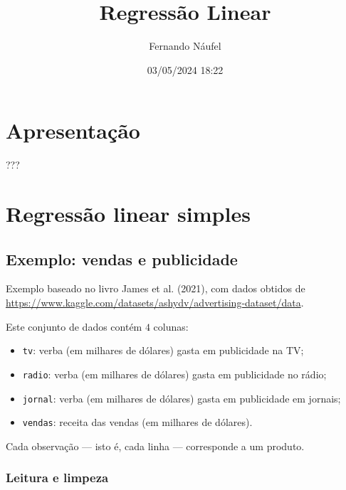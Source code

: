 \documentclass[
  letterpaper,
  DIV=11,
  numbers=noendperiod]{scrreprt}
\title{Regressão Linear}
\author{Fernando Náufel}
\date{03/05/2024 18:22}
\providecommand{\tightlist}{%
  \setlength{\itemsep}{0pt}\setlength{\parskip}{0pt}}\usepackage{longtable,booktabs,array}
\renewcommand*\contentsname{Índice}
\newcommand\contentsname{Índice}
\begin{document}
\maketitle


\renewcommand*\contentsname{Índice}
{
\hypersetup{linkcolor=}
\setcounter{tocdepth}{2}
\tableofcontents
}

\chapter*{Apresentação}\label{apresentauxe7uxe3o}


???


\chapter{Regressão linear simples}\label{regressuxe3o-linear-simples}

\section{Exemplo: vendas e
publicidade}\label{exemplo-vendas-e-publicidade}

Exemplo baseado no livro James et al. (2021), com dados obtidos de
\url{https://www.kaggle.com/datasets/ashydv/advertising-dataset/data}.

Este conjunto de dados contém $4$ colunas:

\begin{itemize}
\tightlist
\item
  \texttt{tv}: verba (em milhares de dólares) gasta em publicidade na
  TV;
\item
  \texttt{radio}: verba (em milhares de dólares) gasta em publicidade no
  rádio;
\item
  \texttt{jornal}: verba (em milhares de dólares) gasta em publicidade
  em jornais;
\item
  \texttt{vendas}: receita das vendas (em milhares de dólares).
\end{itemize}

Cada observação --- isto é, cada linha --- corresponde a um produto.

\subsection{Leitura e limpeza}\label{leitura-e-limpeza}
\end{document}
